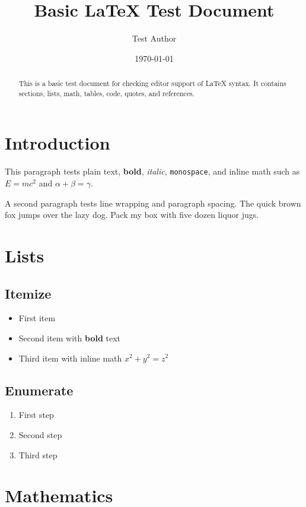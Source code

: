 \documentclass[12pt,a4paper]{article}
\title{Basic \LaTeX{} Test Document}
\author{Test Author}
\date{\today}
\begin{document}
\maketitle

\begin{abstract}
This is a basic test document for checking editor support of \LaTeX{} syntax.
It contains sections, lists, math, tables, code, quotes, and references.
\end{abstract}

\tableofcontents
\newpage

\section{Introduction}

This paragraph tests plain text, \textbf{bold}, \textit{italic}, \texttt{monospace},
and inline math such as $E = mc^2$ and $\alpha + \beta = \gamma$.

A second paragraph tests line wrapping and paragraph spacing. The quick brown fox
jumps over the lazy dog. Pack my box with five dozen liquor jugs.

\section{Lists}

\subsection{Itemize}

\begin{itemize}
  \item First item
  \item Second item with \textbf{bold} text
  \item Third item with inline math $x^2 + y^2 = z^2$
\end{itemize}

\subsection{Enumerate}

\begin{enumerate}
  \item First step
  \item Second step
  \item Third step
\end{enumerate}

\section{Mathematics}
\end{document}
